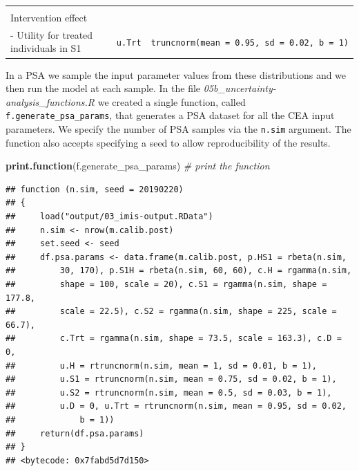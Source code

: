 \documentclass[]{article}
\newenvironment{Shaded}{\begin{snugshade}}{\end{snugshade}}
\newcommand{\KeywordTok}[1]{\textcolor[rgb]{0.13,0.29,0.53}{\textbf{#1}}}
\newcommand{\CommentTok}[1]{\textcolor[rgb]{0.56,0.35,0.01}{\textit{#1}}}
\newcommand{\NormalTok}[1]{#1}
\begin{document}
\begin{longtable}[]{@{}lcc@{}}
\begin{minipage}[t]{0.20\columnwidth}
\end{minipage}\tabularnewline
\begin{minipage}[t]{0.43\columnwidth}\raggedright\strut
Intervention effect\strut
\end{minipage} & \begin{minipage}[t]{0.18\columnwidth}\centering\strut
\strut
\end{minipage} & \begin{minipage}[t]{0.20\columnwidth}\centering\strut
\strut
\end{minipage}\tabularnewline
\begin{minipage}[t]{0.43\columnwidth}\raggedright\strut
- Utility for treated individuals in S1\strut
\end{minipage} & \begin{minipage}[t]{0.18\columnwidth}\centering\strut
\texttt{u.Trt}\strut
\end{minipage} & \begin{minipage}[t]{0.20\columnwidth}\centering\strut
\texttt{truncnorm(mean\ =\ 0.95,\ sd\ =\ 0.02,\ b\ =\ 1)}\strut
\end{minipage}\tabularnewline
\bottomrule
\end{longtable}

In a PSA we sample the input parameter values from these distributions
and we then run the model at each sample. In the file
\emph{05b\_uncertainty-analysis\_functions.R} we created a single
function, called \texttt{f.generate\_psa\_params}, that generates a PSA
dataset for all the CEA input parameters. We specify the number of PSA
samples via the \texttt{n.sim} argument. The function also accepts
specifying a seed to allow reproducibility of the results.

\begin{Shaded}
\begin{Highlighting}[]
\KeywordTok{print.function}\NormalTok{(f.generate_psa_params) }\CommentTok{# print the function }
\end{Highlighting}
\end{Shaded}

\begin{verbatim}
## function (n.sim, seed = 20190220) 
## {
##     load("output/03_imis-output.RData")
##     n.sim <- nrow(m.calib.post)
##     set.seed <- seed
##     df.psa.params <- data.frame(m.calib.post, p.HS1 = rbeta(n.sim, 
##         30, 170), p.S1H = rbeta(n.sim, 60, 60), c.H = rgamma(n.sim, 
##         shape = 100, scale = 20), c.S1 = rgamma(n.sim, shape = 177.8, 
##         scale = 22.5), c.S2 = rgamma(n.sim, shape = 225, scale = 66.7), 
##         c.Trt = rgamma(n.sim, shape = 73.5, scale = 163.3), c.D = 0, 
##         u.H = rtruncnorm(n.sim, mean = 1, sd = 0.01, b = 1), 
##         u.S1 = rtruncnorm(n.sim, mean = 0.75, sd = 0.02, b = 1), 
##         u.S2 = rtruncnorm(n.sim, mean = 0.5, sd = 0.03, b = 1), 
##         u.D = 0, u.Trt = rtruncnorm(n.sim, mean = 0.95, sd = 0.02, 
##             b = 1))
##     return(df.psa.params)
## }
## <bytecode: 0x7fabd5d7d150>
\end{verbatim}
\end{document}

